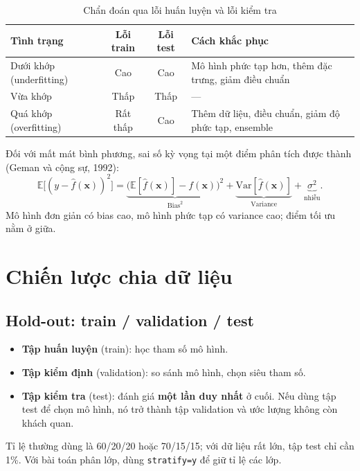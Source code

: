 \begin{table}[H]
\centering
\begin{tabular}{|l|c|c|p{5.5cm}|}
\hline
\textbf{Tình trạng} & \textbf{Lỗi train} & \textbf{Lỗi test} & \textbf{Cách khắc phục} \\
\hline
Dưới khớp (underfitting) & Cao & Cao & Mô hình phức tạp hơn, thêm đặc trưng, giảm điều chuẩn \\ \hline
Vừa khớp & Thấp & Thấp & --- \\ \hline
Quá khớp (overfitting) & Rất thấp & Cao & Thêm dữ liệu, điều chuẩn, giảm độ phức tạp, ensemble \\ \hline
\end{tabular}
\caption{Chẩn đoán qua lỗi huấn luyện và lỗi kiểm tra}
\end{table}

Đối với mất mát bình phương, sai số kỳ vọng tại một điểm phân tích được thành (Geman và cộng sự, 1992):
\begin{equation}
    \mathbb{E}\big[(y - \hat{f}(\mathbf{x}))^2\big] = \underbrace{\big(\mathbb{E}[\hat{f}(\mathbf{x})] - f(\mathbf{x})\big)^2}_{\text{Bias}^2} + \underbrace{\mathrm{Var}[\hat{f}(\mathbf{x})]}_{\text{Variance}} + \underbrace{\sigma^2}_{\text{nhiễu}} .
\end{equation}
Mô hình đơn giản có bias cao, mô hình phức tạp có variance cao; điểm tối ưu nằm ở giữa.


\section{Chiến lược chia dữ liệu}

\subsection{Hold-out: train / validation / test}

\begin{itemize}
    \item \textbf{Tập huấn luyện} (train): học tham số mô hình.
    \item \textbf{Tập kiểm định} (validation): so sánh mô hình, chọn siêu tham số.
    \item \textbf{Tập kiểm tra} (test): đánh giá \textbf{một lần duy nhất} ở cuối. Nếu dùng tập test để chọn mô hình, nó trở thành tập validation và ước lượng không còn khách quan.
\end{itemize}
Tỉ lệ thường dùng là 60/20/20 hoặc 70/15/15; với dữ liệu rất lớn, tập test chỉ cần 1\%. Với bài toán phân lớp, dùng \texttt{stratify=y} để giữ tỉ lệ các lớp.

